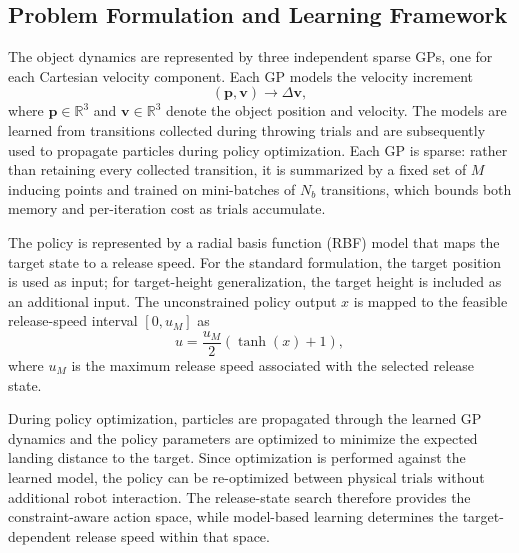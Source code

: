 \documentclass[letterpaper, 10 pt, conference]{ieeeconf}
\begin{document}
\subsection{Problem Formulation and Learning Framework}
\label{sec:method-formulation}

The object dynamics are represented by three independent sparse GPs, one for
each Cartesian velocity component. Each GP models the velocity increment
\begin{equation}
(\mathbf{p},\mathbf{v}) \rightarrow \Delta\mathbf{v},
\end{equation}
where $\mathbf{p}\in\mathbb{R}^{3}$ and $\mathbf{v}\in\mathbb{R}^{3}$ denote
the object position and velocity. The models are learned from transitions
collected during throwing trials and are subsequently used to propagate
particles during policy optimization. Each GP is sparse: rather than retaining
every collected transition, it is summarized by a fixed set of $M$ inducing
points and trained on mini-batches of $N_b$ transitions, which bounds both
memory and per-iteration cost as trials accumulate.

The policy is represented by a radial basis function (RBF) model that maps the
target state to a release speed. For the standard formulation, the target
position is used as input; for target-height generalization, the target height
is included as an additional input. The unconstrained policy output $x$ is
mapped to the feasible release-speed interval $[0,u_M]$ as
\begin{equation}
u=\frac{u_M}{2}\left(\tanh(x)+1\right),
\label{eq:policy-squash}
\end{equation}
where $u_M$ is the maximum release speed associated with the selected release
state.

During policy optimization, particles are propagated through the learned GP
dynamics and the policy parameters are optimized to minimize the expected
landing distance to the target. Since optimization is performed against the
learned model, the policy can be re-optimized between physical trials without
additional robot interaction. The release-state search therefore provides the
constraint-aware action space, while model-based learning determines the
target-dependent release speed within that space.
\end{document}
